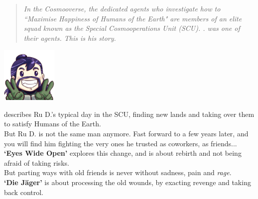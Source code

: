 

\begin{abstract}
\noindent
\emph{\normalsize{In the Cosmooverse, the dedicated agents who investigate how to ``Maximise Happiness of Humans of the Earth" are members of an elite squad known as the Special Cosmooperations Unit (SCU). . was one of their agents. This is his story.}}
\end{abstract}

\begin{center}
\includegraphics[width=0.2\textwidth]{Assets/happyD_512}
\end{center}


 describes Ru D.'s typical day in the SCU, finding new lands and taking over them to satisfy Humans of the Earth.\\

But Ru D. is not the same man anymore. Fast forward to a few years later, and you will find him fighting the very ones he trusted as coworkers, as friends...\\

\textbf{`Eyes Wide Open'} explores this change, and is about rebirth and not being afraid of taking risks. \\

But parting ways with old friends is never without sadness, pain and \emph{rage}.\\

\textbf{`Die Jäger'} is about processing the old wounds, by exacting revenge and taking back control.

\clearpage